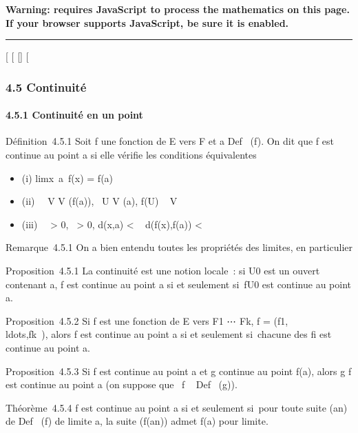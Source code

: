 \textbf{Warning: 
requires JavaScript to process the mathematics on this page.\\ If your
browser supports JavaScript, be sure it is enabled.}

\begin{center}\rule{3in}{0.4pt}\end{center}

{[}
{[}
{[}{]}
{[}

\subsubsection{4.5 Continuité}

\paragraph{4.5.1 Continuité en un point}

Définition~4.5.1 Soit f une fonction de E vers F et a
\in Def~ (f). On dit que f est continue au point
a si elle vérifie les conditions équivalentes

\begin{itemize}
\itemsep1pt\parskip0pt
\item
  (i) limx\rightarrow~a~f(x) = f(a)
\item
  (ii) \forall~~V \in V (f(a)),
  \exists~U \in V (a), f(U) \subset~ V
\item
  (iii) \forall~~\epsilon \textgreater{} 0,
  \exists~\eta \textgreater{} 0, d(x,a) \textless{} \eta \rigtharrow~
  d(f(x),f(a)) \textless{} \epsilon
\end{itemize}

Remarque~4.5.1 On a bien entendu toutes les propriétés des limites, en
particulier

Proposition~4.5.1 La continuité est une notion locale~: si U0
est un ouvert contenant a, f est continue au point a si et seulement
si~f\textbar{}U0 est continue au point a.

Proposition~4.5.2 Si f est une fonction de E vers F1
\times⋯ \times Fk, f =
(f1,\\ldots,fk~),
alors f est continue au point a si et seulement si~chacune des
fi est continue au point a.

Proposition~4.5.3 Si f est continue au point a et g continue au point
f(a), alors g \cdot f est continue au point a (on suppose que
\mathrmIm~f
\subset~ Def~ (g)).

Théorème~4.5.4 f est continue au point a si et seulement si~pour toute
suite (an) de Def~ (f) de limite a,
la suite (f(an)) admet f(a) pour limite.


